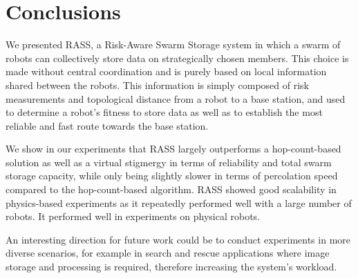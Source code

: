 \documentclass[letterpaper, 10 pt, conference]{ieeeconf}
\begin{document}
\section{Conclusions}
\label{conclusion}

We presented RASS, a Risk-Aware Swarm Storage system in which a swarm of robots can collectively store data on strategically chosen members. This choice is made without central coordination and is purely based on local information shared between the robots. This information is simply composed of risk measurements and topological distance from a robot to a base station, and used to determine a robot's fitness to store data as well as to establish the most reliable and fast route towards the base station.

We show in our experiments that RASS largely outperforms a hop-count-based solution as well as a virtual stigmergy in terms of reliability and total swarm storage capacity, while only being slightly slower in terms of percolation speed compared to the hop-count-based algorithm. RASS showed good scalability in physics-based experiments as it repeatedly performed well with a large number of robots. It performed well in experiments on physical robots.

An interesting direction for future work could be to conduct experiments in more diverse scenarios, for example in search and rescue applications where image storage and processing is required, therefore increasing the system's workload.



\end{document}
